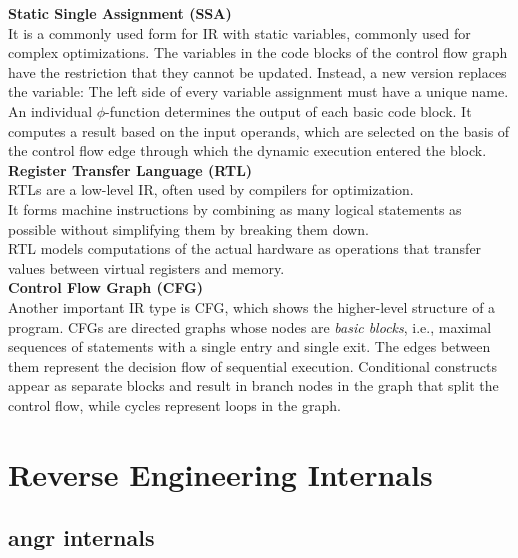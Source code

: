 \documentclass[seminar]{plai}
\begin{document}
\noindent\textbf{Static Single Assignment (SSA)}\\
It is a commonly used form for IR with static variables, commonly used for complex optimizations. The variables in the code blocks of the control flow graph have the restriction that they cannot be updated. Instead, a new version replaces the variable\cite{introduction-to-compilers-and-language-design}: The left side of every variable assignment must have a unique name. An individual $\phi$-function determines the output of each basic code block. It computes a result based on the input operands, which are selected on the basis of the control flow edge through which the dynamic execution entered the block.\cite{interpreting-programs-in-SSA-form}\\


\noindent\textbf{Register Transfer Language (RTL)}\\
RTLs are a low-level IR, often used by compilers for optimization.\\
It forms machine instructions by combining as many logical statements as possible without simplifying them by breaking them down.\\
RTL models computations of the actual hardware as operations that transfer values between virtual registers and memory.
\cite{The-RTL-System-A-Framework-for-Code-Optimization}\\

\noindent\textbf{Control Flow Graph (CFG)}\\
Another important IR type is CFG, which shows the higher-level structure of a program. CFGs are directed graphs whose nodes are \textit{basic blocks}, i.e., maximal sequences of statements with a single entry and single exit.
The edges between them represent the decision flow of sequential execution. Conditional constructs appear as separate blocks and result in branch nodes in the graph that split the control flow, while cycles represent loops in the graph.
\cite{introduction-to-compilers-and-language-design}

\section{Reverse Engineering Internals}
\label{sec:reverse-engineering-internals}

\subsection{angr internals}
\label{sec:angr-internals}
\end{document}
